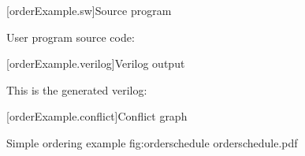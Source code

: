 
\pnum

[orderExample.sw]{Source program}

User program source code:


[orderExample.verilog]{Verilog output}

This is the generated verilog:



[orderExample.conflict]{Conflict graph}

\begin{importgraphic}
{Simple ordering example}
{fig:orderschedule}
{orderschedule.pdf}
\end{importgraphic}
